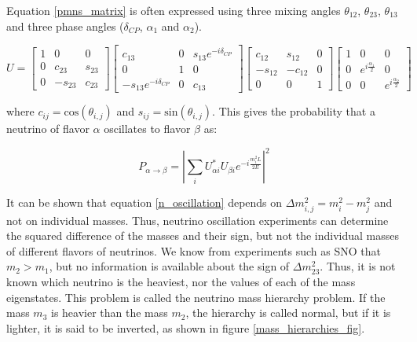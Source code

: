 Equation \ref{pmns_matrix} is often expressed using three mixing angles $\theta_{12}$, $\theta_{23}$, $\theta_{13}$ and three phase angles ($\delta_{CP}$, $\alpha_1$ and $\alpha_2$).

\begin{equation}\label{pmns_matrix_expanded}
U = \begin{bmatrix} 1 & 0 & 0\\ 0 & c_{23} & s_{23} \\ 0 & -s_{23} & c_{23} \end{bmatrix} \begin{bmatrix} c_{13} & 0 & s_{13}e^{-i\delta_{CP}}\\ 0 & 1 & 0 \\ -s_{13}e^{-i\delta_{CP}} & 0 & c_{13} \end{bmatrix} \begin{bmatrix} c_{12} & s_{12} & 0\\ -s_{12} & -c_{12} & 0 \\ 0 & 0 & 1 \end{bmatrix} \begin{bmatrix} 1 & 0 & 0\\ 0 & e^{i\frac{\alpha_1}{2}} & 0 \\ 0 & 0 & e^{i\frac{\alpha_2}{2}}\end{bmatrix}
\end{equation}

where $c_{ij}=\mathrm{cos}(\theta_{i,j})$ and $s_{ij}=\mathrm{sin}(\theta_{i,j})$. This gives the probability that a neutrino of flavor $\alpha$ oscillates to flavor $\beta$ as:

\begin{equation}\label{n_oscillation}
P_{\alpha\rightarrow\beta} = \left|\sum_i U^*_{\alpha i}U_{\beta i} e^{-i\frac{m_i^2L}{2E}}\right|^2
\end{equation}

It can be shown that equation \ref{n_oscillation} depends on $\Delta m^2_{i,j}=m^2_i-m^2_j$ and not on individual masses. Thus, neutrino oscillation experiments can determine the squared difference of the masses and their sign, but not the individual masses of different flavors of neutrinos. We know from experiments such as SNO that $m_2>m_1$, but no information is available about the sign of $\Delta m_{23}^2$. Thus, it is not known which neutrino is the heaviest, nor the values of each of the mass eigenstates. This problem is called the neutrino mass hierarchy problem. If the mass $m_3$ is heavier than the mass $m_2$, the hierarchy is called normal, but if it is lighter, it is said to be inverted, as shown in figure \ref{mass_hierarchies_fig}.

